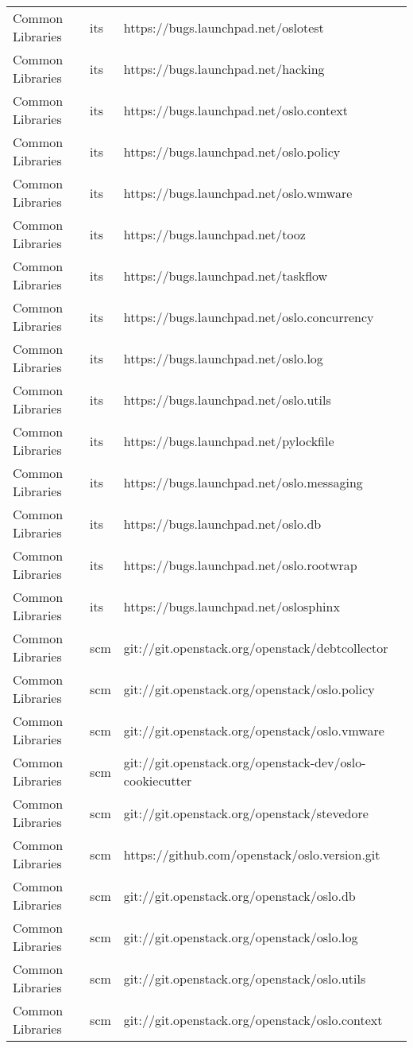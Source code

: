 \begin{center}
\begin{longtable}{|p{4cm}|p{1cm}|p{10cm}|}
Common Libraries&its&https://bugs.launchpad.net/oslotest\\ 
Common Libraries&its&https://bugs.launchpad.net/hacking\\ 
Common Libraries&its&https://bugs.launchpad.net/oslo.context\\ 
Common Libraries&its&https://bugs.launchpad.net/oslo.policy\\ 
Common Libraries&its&https://bugs.launchpad.net/oslo.wmware\\ 
Common Libraries&its&https://bugs.launchpad.net/tooz\\ 
Common Libraries&its&https://bugs.launchpad.net/taskflow\\ 
Common Libraries&its&https://bugs.launchpad.net/oslo.concurrency\\ 
Common Libraries&its&https://bugs.launchpad.net/oslo.log\\ 
Common Libraries&its&https://bugs.launchpad.net/oslo.utils\\ 
Common Libraries&its&https://bugs.launchpad.net/pylockfile\\ 
Common Libraries&its&https://bugs.launchpad.net/oslo.messaging\\ 
Common Libraries&its&https://bugs.launchpad.net/oslo.db\\ 
Common Libraries&its&https://bugs.launchpad.net/oslo.rootwrap\\ 
Common Libraries&its&https://bugs.launchpad.net/oslosphinx\\ 
Common Libraries&scm&git://git.openstack.org/openstack/debtcollector\\ 
Common Libraries&scm&git://git.openstack.org/openstack/oslo.policy\\ 
Common Libraries&scm&git://git.openstack.org/openstack/oslo.vmware\\ 
Common Libraries&scm&git://git.openstack.org/openstack-dev/oslo-cookiecutter\\ 
Common Libraries&scm&git://git.openstack.org/openstack/stevedore\\ 
Common Libraries&scm&https://github.com/openstack/oslo.version.git\\ 
Common Libraries&scm&git://git.openstack.org/openstack/oslo.db\\ 
Common Libraries&scm&git://git.openstack.org/openstack/oslo.log\\ 
Common Libraries&scm&git://git.openstack.org/openstack/oslo.utils\\ 
Common Libraries&scm&git://git.openstack.org/openstack/oslo.context\\ 

\end{longtable}
\end{center}
